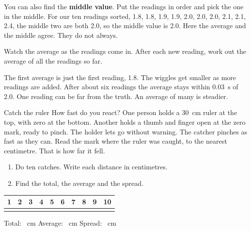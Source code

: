 You can also find the \textbf{middle value}. Put the readings in order and pick the one in the middle. For our ten readings sorted, 1.8, 1.8, 1.9, 1.9, 2.0, 2.0, 2.0, 2.1, 2.1, 2.4, the middle two are both 2.0, so the middle value is 2.0. Here the average and the middle agree. They do not always.

\clearpage

Watch the average as the readings come in. After each new reading, work out the average of all the readings so far.

\begin{center}
\end{center}
The first average is just the first reading, 1.8. The wiggles get smaller as more readings are added. After about six readings the average stays within 0.03~s of 2.0. One reading can be far from the truth. An average of many is steadier.

\begin{tryit}{Catch the ruler}
How fast do you react? One person holds a 30~cm ruler at the top, with zero at the bottom. Another holds a thumb and finger open at the zero mark, ready to pinch. The holder lets go without warning. The catcher pinches as fast as they can. Read the mark where the ruler was caught, to the nearest centimetre. That is how far it fell.
\begin{enumerate}[leftmargin=1.6em]
\item Do ten catches. Write each distance in centimetres.
\item Find the total, the average and the spread.
\end{enumerate}
\renewcommand{\arraystretch}{1.5}
\begin{tabular}{|c|c|c|c|c|c|c|c|c|c|}
\hline
\textbf{1}&\textbf{2}&\textbf{3}&\textbf{4}&\textbf{5}&\textbf{6}&\textbf{7}&\textbf{8}&\textbf{9}&\textbf{10}\\ \hline
\rule{0pt}{0.8cm}&&&&&&&&&\\ \hline
\end{tabular}
\par\medskip
Total: \wline[1.6cm]~cm \quad Average: \wline[1.6cm]~cm \quad Spread: \wline[1.6cm]~cm
\end{tryit}

